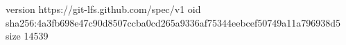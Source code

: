 version https://git-lfs.github.com/spec/v1
oid sha256:4a3fb698e47c90d8507ccba0cd265a9336af75344eebcef50749a11a796938d5
size 14539
